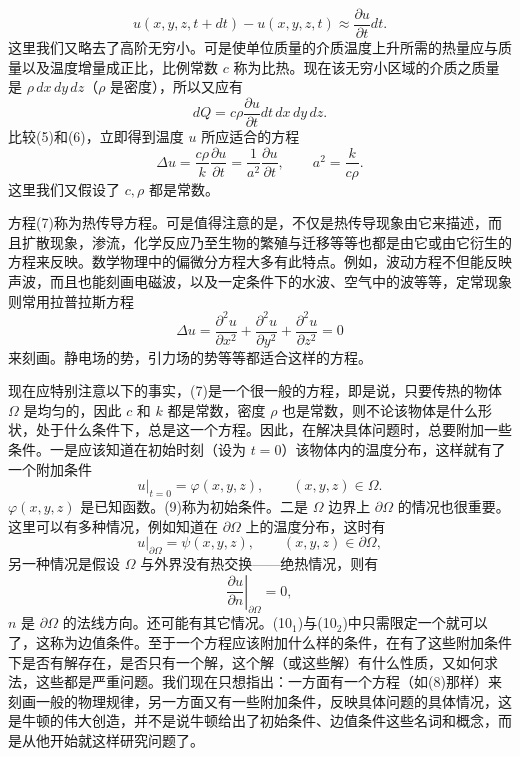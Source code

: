 \[
u(x,y,z,t+dt)-u(x,y,z,t)\approx \frac{\partial u}{\partial t}dt.
\]
这里我们又略去了高阶无穷小。可是使单位质量的介质温度上升所需的热量应与质量以及温度增量成正比，比例常数 $c$ 称为比热。现在该无穷小区域的介质之质量是 $\rho\,dx\,dy\,dz$（$\rho$ 是密度），所以又应有
\begin{equation}
 dQ=c\rho\frac{\partial u}{\partial t}dt\,dx\,dy\,dz.
 \tag{6}
\end{equation}
比较(5)和(6)，立即得到温度 $u$ 所应适合的方程
\begin{equation}
 \Delta u=\frac{c\rho}{k}\frac{\partial u}{\partial t}=\frac1{a^2}\frac{\partial u}{\partial t},\qquad a^2=\frac{k}{c\rho}.
 \tag{7}
\end{equation}
这里我们又假设了 $c,\rho$ 都是常数。

方程(7)称为热传导方程。可是值得注意的是，不仅是热传导现象由它来描述，而且扩散现象，渗流，化学反应乃至生物的繁殖与迁移等等也都是由它或由它衍生的方程来反映。数学物理中的偏微分方程大多有此特点。例如，波动方程不但能反映声波，而且也能刻画电磁波，以及一定条件下的水波、空气中的波等等，定常现象则常用拉普拉斯方程
\begin{equation}
 \Delta u=\frac{\partial^2u}{\partial x^2}+\frac{\partial^2u}{\partial y^2}+\frac{\partial^2u}{\partial z^2}=0
 \tag{8}
\end{equation}
来刻画。静电场的势，引力场的势等等都适合这样的方程。

现在应特别注意以下的事实，(7)是一个很一般的方程，即是说，只要传热的物体 $\Omega$ 是均匀的，因此 $c$ 和 $k$ 都是常数，密度 $\rho$ 也是常数，则不论该物体是什么形状，处于什么条件下，总是这一个方程。因此，在解决具体问题时，总要附加一些条件。一是应该知道在初始时刻（设为 $t=0$）该物体内的温度分布，这样就有了一个附加条件
\begin{equation}
 \left.u\right|_{t=0}=\varphi(x,y,z),\qquad (x,y,z)\in\Omega.
 \tag{9}
\end{equation}
$\varphi(x,y,z)$ 是已知函数。(9)称为初始条件。二是 $\Omega$ 边界上 $\partial\Omega$ 的情况也很重要。这里可以有多种情况，例如知道在 $\partial\Omega$ 上的温度分布，这时有
\begin{equation}
 \left.u\right|_{\partial\Omega}=\psi(x,y,z),\qquad (x,y,z)\in\partial\Omega,
 \tag{$10_1$}
\end{equation}
另一种情况是假设 $\Omega$ 与外界没有热交换——绝热情况，则有
\begin{equation}
 \left.\frac{\partial u}{\partial n}\right|_{\partial\Omega}=0,
 \tag{$10_2$}
\end{equation}
$n$ 是 $\partial\Omega$ 的法线方向。还可能有其它情况。(10$_1$)与(10$_2$)中只需限定一个就可以了，这称为边值条件。至于一个方程应该附加什么样的条件，在有了这些附加条件下是否有解存在，是否只有一个解，这个解（或这些解）有什么性质，又如何求法，这些都是严重问题。我们现在只想指出：一方面有一个方程（如(8)那样）来刻画一般的物理规律，另一方面又有一些附加条件，反映具体问题的具体情况，这是牛顿的伟大创造，并不是说牛顿给出了初始条件、边值条件这些名词和概念，而是从他开始就这样研究问题了。


